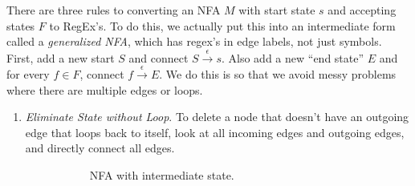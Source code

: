   \begin{algo}
    There are three rules to converting an NFA $M$ with start state $s$ and accepting states $F$ to RegEx's. To do this, we actually put this into an intermediate form called a \textit{generalized NFA}, which has regex's in edge labels, not just symbols. First, add a new start $S$ and connect $S \xrightarrow{\epsilon} s$. Also add a new ``end state'' $E$ and for every $f \in F$, connect $f \xrightarrow{\epsilon} E$. We do this is so that we avoid messy problems where there are multiple edges or loops. 

    \begin{enumerate}
      \item \textit{Eliminate State without Loop}. To delete a node that doesn't have an outgoing edge that loops back to itself, look at all incoming edges and outgoing edges, and directly connect all edges. 

        \begin{figure}[H]
          \centering
          \begin{subfigure}[b]{0.48\textwidth}
            \centering
            \caption{NFA with intermediate state.}
            \label{fig:nfa_with_center}
          \end{subfigure}
          \hfill 
          \begin{subfigure}[b]{0.48\textwidth}
            \centering
\end{subfigure}
\end{figure}
\end{enumerate}
\end{algo}

